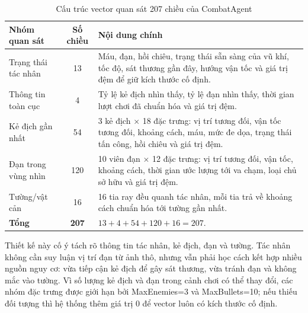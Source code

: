 \begin{table}[H]
    \centering
    \small
    \caption{Cấu trúc vector quan sát 207 chiều của CombatAgent}
    \label{tab:obs_207}
    \begin{tabular}{|p{4cm}|c|p{8cm}|}
        \hline
        \textbf{Nhóm quan sát} & \textbf{Số chiều} & \textbf{Nội dung chính} \\
        \hline
        Trạng thái tác nhân & 13 & Máu, đạn, hồi chiêu, trạng thái sẵn sàng của vũ khí, tốc độ, sát thương gần đây, hướng vận tốc và giá trị đệm để giữ kích thước cố định. \\
        \hline
        Thông tin toàn cục & 4 & Tỷ lệ kẻ địch nhìn thấy, tỷ lệ đạn nhìn thấy, thời gian lượt chơi đã chuẩn hóa và giá trị đệm. \\
        \hline
        Kẻ địch gần nhất & 54 & 3 kẻ địch $\times$ 18 đặc trưng: vị trí tương đối, vận tốc tương đối, khoảng cách, máu, mức đe dọa, trạng thái tấn công, hồi chiêu và giá trị đệm. \\
        \hline
        Đạn trong vùng nhìn & 120 & 10 viên đạn $\times$ 12 đặc trưng: vị trí tương đối, vận tốc, khoảng cách, thời gian ước lượng tới va chạm, loại chủ sở hữu và giá trị đệm. \\
        \hline
        Tường/vật cản & 16 & 16 tia ray đều quanh tác nhân, mỗi tia trả về khoảng cách chuẩn hóa tới tường gần nhất. \\
        \hline
        \textbf{Tổng} & \textbf{207} & $13 + 4 + 54 + 120 + 16 = 207$. \\
        \hline
    \end{tabular}
\end{table}


Thiết kế này cố ý tách rõ thông tin tác nhân, kẻ địch, đạn và tường. Tác nhân không cần suy luận vị trí đạn từ ảnh thô, nhưng vẫn phải học cách kết hợp nhiều nguồn nguy cơ: vừa tiếp cận kẻ địch để gây sát thương, vừa tránh đạn và không mắc vào tường. Vì số lượng kẻ địch và đạn trong cảnh chơi có thể thay đổi, các nhóm đặc trưng được giới hạn bởi MaxEnemies=3 và MaxBullets=10; nếu thiếu đối tượng thì hệ thống thêm giá trị 0 để vector luôn có kích thước cố định.

